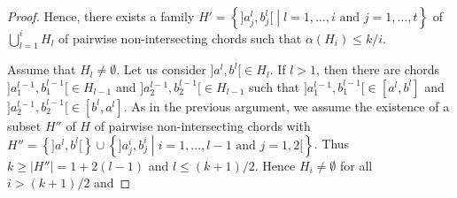 \documentclass{article}
\theoremstyle{definition}
\begin{document}
\begin{proof}
        Hence, there exists a
        family $H' = \left\{]a^{l}_{j}, b^{l}_{j}[
        \middle| l = 1, \ldots, i \text{ and }
        j = 1, \ldots, t\right\}$ of
        $\bigcup_{l = 1}^{i} H_{l}$
        of pairwise non-intersecting
        chords such that $\alpha\left(H_{i}\right) \leq k/i$.

        Assume that $H_{l} \neq \emptyset$.
        Let us consider $]a^{l}, b^{l}[
        \in H_{l}$. If $l > 1$,
        then there are chords
        $]a^{l-1}_{1}, b^{l-1}_{1}[ \in H_{l-1}$
        and $]a^{l-1}_{2}, b^{l-1}_{2}[ \in H_{l-1}$ 
        such that $]a^{l-1}_{1}, b^{l-1}_{1}[
        \in [a^{l}, b^{l}]$ and
        $]a^{l-1}_{2}, b^{l-1}_{2}[ \in [b^{l}, a^{l}]$.
        As in the previous argument,
        we assume the existence of a
        subset $H''$ of $H$ of
        pairwise non-intersecting chords
        with $H'' = \left\{]a^{l}, b^{l}[\right\}
        \cup \left\{]a^{i}_{j}, b^{i}_{j}
        \middle| i = 1, \ldots, l-1
        \text{ and } j = 1, 2[\right\}$.
        Thus $k \geq \left|H''\right|
        = 1 + 2\left(l-1\right)$
        and $l \leq (k+1)/2$.
        Hence $H_{i} \neq \emptyset$ 
        for all $i > (k+1)/2$
        and 
    \end{proof}
\end{document}
